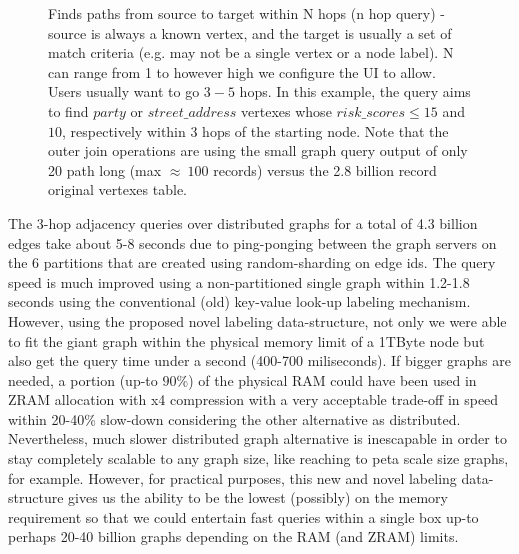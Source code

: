 \documentclass[preprint,3p,twocolumn]{elsarticle}
\begin{document}
\begin{figure}
\centering
    \caption{Finds paths from source to target within N hops (n hop query) - source is always a known vertex, and the target is usually a set of match criteria (e.g. may not be a single vertex or a node label). N can range from 1 to however high we configure the UI to allow. Users usually want to go $3-5$ hops. In this example, the query aims to find $party$ or $street\_address$ vertexes whose $risk\_scores \le 15$ and $10$, respectively within 3 hops of the starting node. Note that the outer join operations are using the small graph query output of only 20 path long (max $\approx~100$ records) versus the 2.8 billion record original vertexes table.}
    \label{Figure:queries}
\end{figure}

The 3-hop adjacency queries over distributed graphs for a total of 4.3 billion edges take about 5-8 seconds due to ping-ponging between the graph servers on the 6 partitions that are created using random-sharding on edge ids. The query speed is much improved using a non-partitioned single graph within 1.2-1.8 seconds using the conventional (old) key-value look-up labeling mechanism. However, using the proposed novel labeling data-structure, not only we were able to fit the giant graph within the physical memory limit of a 1TByte node but also get the query time under a second (400-700 miliseconds). If bigger graphs are needed, a portion (up-to $90\%$) of the physical RAM could have been used in ZRAM allocation with x4 compression with a very acceptable trade-off in speed within 20-40\% slow-down considering the other alternative as  distributed. Nevertheless, much slower distributed graph alternative is inescapable in order to stay completely scalable to any graph size, like reaching to peta scale size graphs, for example. However, for practical purposes, this new and novel labeling data-structure gives us the ability to be the lowest (possibly) on the memory requirement so that we could entertain fast queries within a single box up-to perhaps 20-40 billion graphs depending on the RAM (and ZRAM) limits.
\end{document}
